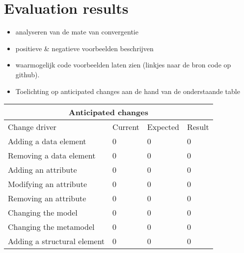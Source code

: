 \chapter{Evaluation results} \label{evaluation}

\begin{itemize}
    \item analyseren van de mate van convergentie
    \item positieve \& negatieve voorbeelden beschrijven
    \item waarmogelijk code voorbeelden laten zien (linkjes naar de bron code op github).
    \item Toelichting op anticipated changes aan de hand van de onderstaande table
\end{itemize}

\begin{tabular}{ |p{5cm}||p{2cm}|p{2cm}|p{2cm}|  }
    \hline
    \multicolumn{4}{|c|}{Anticipated changes} \\
    \hline
    Change driver &Current &Expected &Result\\
    \hline
    Adding a data element &0 &0 &0\\
    Removing a data element &0 &0 &0\\
    Adding an attribute &0 &0 &0\\
    Modifying an attribute &0 &0 &0\\
    Removing an attribute    &0 &0 &0\\
    Changing the model &0 &0 &0\\
    Changing the metamodel &0 &0 &0\\
    Adding a structural element &0 &0 &0\\
    \hline
   \end{tabular}
